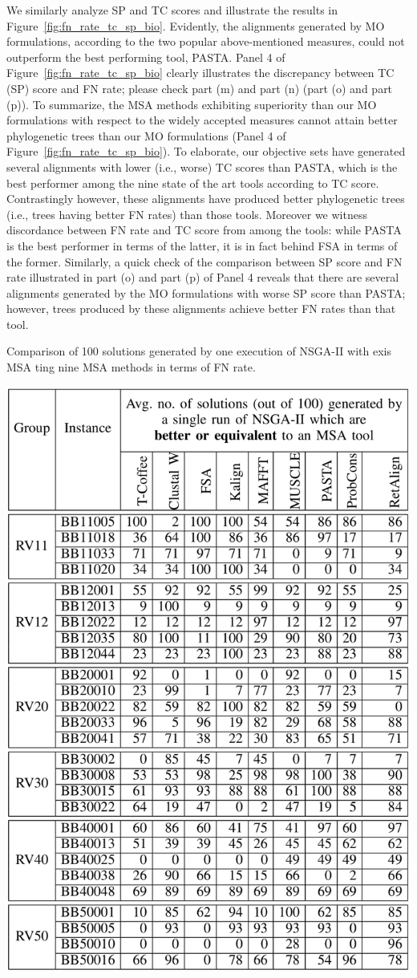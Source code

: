 We similarly analyze SP and TC scores and illustrate the results in Figure~\ref{fig:fn_rate_tc_sp_bio}. Evidently, the alignments generated by MO formulations, according to the two popular above-mentioned measures, could not outperform the best performing tool, PASTA.
Panel 4 of Figure~\ref{fig:fn_rate_tc_sp_bio} clearly illustrates the discrepancy between TC (SP) score and FN rate; please check part (m) and part (n) (part (o) and part (p)).
To summarize, the MSA methods exhibiting superiority than our MO formulations with respect to the widely accepted measures cannot attain better phylogenetic trees than our MO formulations (Panel 4 of Figure~\ref{fig:fn_rate_tc_sp_bio}). To elaborate, our objective sets have generated several alignments with lower (i.e., worse) TC scores than PASTA, which is the best performer among the nine state of the art tools according to TC score.  
Contrastingly however, these alignments have produced better phylogenetic trees (i.e., trees having better FN rates) than those tools. Moreover we witness discordance between FN rate and TC score from among the tools: while PASTA is the best performer in terms of the latter, it is in fact behind FSA in terms of the former. Similarly, a quick check of the comparison between SP score and FN rate illustrated in part (o) and part (p) of Panel 4 reveals that there are several alignments generated by the MO formulations with worse SP score than PASTA; however, trees produced by these alignments achieve better FN rates than that tool.   

\begin{table}[!h]
\centering
	\caption{Comparison of 100 solutions generated by one execution of NSGA-II with exis MSA ting nine MSA methods in terms of FN rate.} \includegraphics[width=0.7\columnwidth]{Figure/comparison_gap_sop}
	\label{tab:balibase_good_solutions}
\end{table}




